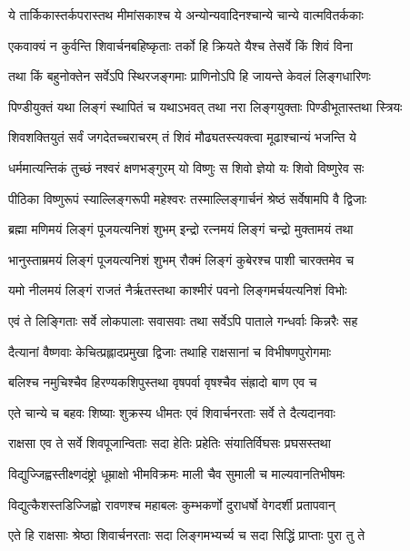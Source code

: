 \twolineshloka
{ये तार्किकास्तर्कपरास्तथ मीमांसकाश्च ये}
{अन्योन्यवादिनश्चान्ये चान्ये वात्मवितर्ककाः}%

\twolineshloka
{एकवाक्यं न कुर्वन्ति शिवार्चनबहिष्कृताः}
{तर्को हि क्रियते यैश्च तेसर्वे किं शिवं विना}%

\twolineshloka
{तथा किं बहुनोक्तेन सर्वेऽपि स्थिरजङ्गमाः}
{प्राणिनोऽपि हि जायन्ते केवलं लिङ्गधारिणः}%

\twolineshloka
{पिण्डीयुक्तं यथा लिङ्गं स्थापितं च यथाऽभवत्}
{तथा नरा लिङ्गयुक्ताः पिण्डीभूतास्तथा स्त्रियः}%

\twolineshloka
{शिवशक्तियुतं सर्वं जगदेतच्चराचरम्}
{तं शिवं मौढ्यतस्त्यक्त्वा मूढाश्चान्यं भजन्ति ये}%

\twolineshloka
{धर्ममात्यन्तिकं तुच्छं नश्वरं क्षणभङ्गुरम्}
{यो विष्णुः स शिवो ज्ञेयो यः शिवो विष्णुरेव सः}%

\twolineshloka
{पीठिका विष्णुरूपं स्याल्लिङ्गरूपी महेश्वरः}
{तस्माल्लिङ्गार्चनं श्रेष्ठं सर्वेषामपि वै द्विजाः}%

\twolineshloka
{ब्रह्मा मणिमयं लिङ्गं पूजयत्यनिशं शुभम्}
{इन्द्रो रत्नमयं लिङ्गं चन्द्रो मुक्तामयं तथा}%

\twolineshloka
{भानुस्ताम्रमयं लिङ्गं पूजयत्यनिशं शुभम्}
{रौक्मं लिङ्गं कुबेरश्च पाशी चारक्तमेव च}%

\twolineshloka
{यमो नीलमयं लिङ्गं राजतं नैर्ऋतस्तथा}
{काश्मीरं पवनो लिङ्गमर्चयत्यनिशं विभोः}%

\twolineshloka
{एवं ते लिङ्गिताः सर्वे लोकपालाः सवासवाः}
{तथा सर्वेऽपि पाताले गन्धर्वाः किन्नरैः सह}%

\twolineshloka
{दैत्यानां वैष्णवाः केचित्प्रह्लादप्रमुखा द्विजाः}
{तथाहि राक्षसानां च विभीषणपुरोगमाः}%

\twolineshloka
{बलिश्च नमुचिश्चैव हिरण्यकशिपुस्तथा}
{वृषपर्वा वृषश्चैव संह्रादो बाण एव च}%

\twolineshloka
{एते चान्ये च बहवः शिष्याः शुक्रस्य धीमतः}
{एवं शिवार्चनरताः सर्वे ते दैत्यदानवाः}%

\twolineshloka
{राक्षसा एव ते सर्वे शिवपूजान्विताः सदा}
{हेतिः प्रहेतिः संयातिर्विघसः प्रघसस्तथा}%

\twolineshloka
{विद्युज्जिह्वस्तीक्ष्णदंष्ट्रो धूम्राक्षो भीमविक्रमः}
{माली चैव सुमाली च माल्यवानतिभीषमः}%

\twolineshloka
{विद्युत्कैशस्तडिज्जिह्वो रावणश्च महाबलः}
{कुम्भकर्णो दुराधर्षो वेगदर्शी प्रतापवान्}%

\twolineshloka
{एते हि राक्षसाः श्रेष्ठा शिवार्चनरताः सदा}
{लिङ्गमभ्यर्च्य च सदा सिद्धिं प्राप्ताः पुरा तु ते}%

